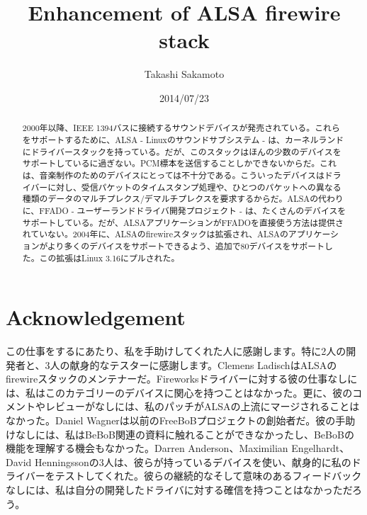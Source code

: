 \documentclass[onecolumn]{jarticle}
\begin{document}

\title{Enhancement of ALSA firewire stack}
\author{Takashi Sakamoto}
\date{2014/07/23}
\maketitle{}

\begin{abstract}

2000年以降、IEEE 1394バスに接続するサウンドデバイスが発売されている。これらをサポートするために、ALSA - Linuxのサウンドサブシステム - は、カーネルランドにドライバースタックを持っている。だが、このスタックはほんの少数のデバイスをサポートしているに過ぎない。PCM標本を送信することしかできないからだ。これは、音楽制作のためのデバイスにとっては不十分である。こういったデバイスはドライバーに対し、受信パケットのタイムスタンプ処理や、ひとつのパケットへの異なる種類のデータのマルチプレクス/デマルチプレクスを要求するからだ。ALSAの代わりに、FFADO - ユーザーランドドライバ開発プロジェクト - は、たくさんのデバイスをサポートしている。だが、ALSAアプリケーションがFFADOを直接使う方法は提供されていない。2004年に、ALSAのfirewireスタックは拡張され、ALSAのアプリケーションがより多くのデバイスをサポートできるよう、追加で80デバイスをサポートした。この拡張はLinux 3.16にプルされた。

\end{abstract}

\section*{Acknowledgement}

この仕事をするにあたり、私を手助けしてくれた人に感謝します。特に2人の開発者と、3人の献身的なテスターに感謝します。Clemens LadischはALSAのfirewireスタックのメンテナーだ。Fireworksドライバーに対する彼の仕事なしには、私はこのカテゴリーのデバイスに関心を持つことはなかった。更に、彼のコメントやレビューがなしには、私のパッチがALSAの上流にマージされることはなかった。Daniel Wagnerは以前のFreeBoBプロジェクトの創始者だ。彼の手助けなしには、私はBeBoB関連の資料に触れることができなかったし、BeBoBの機能を理解する機会もなかった。Darren Anderson、Maximilian Engelhardt、David Henningssonの3人は、彼らが持っているデバイスを使い、献身的に私のドライバーをテストしてくれた。彼らの継続的なそして意味のあるフィードバックなしには、私は自分の開発したドライバに対する確信を持つことはなかっただろう。

\newpage

\tableofcontents
\end{document}
